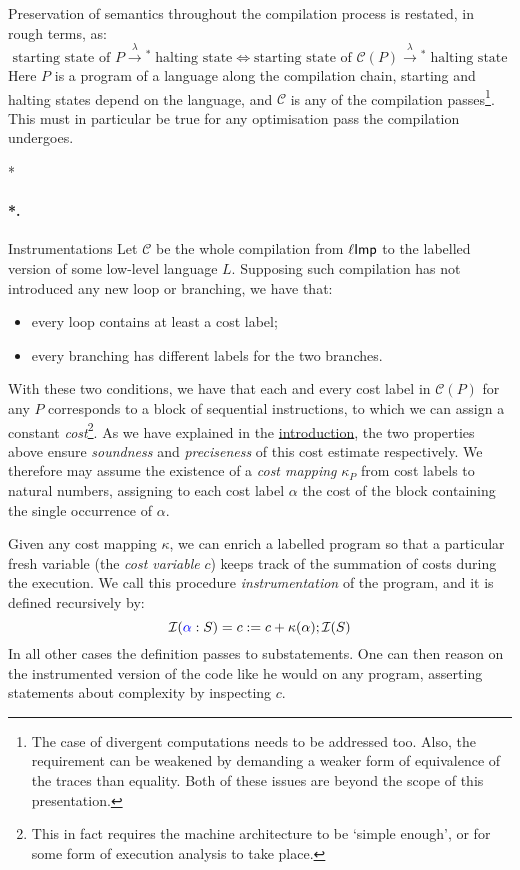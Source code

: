 \documentclass[submission,copyright,creativecommons]{eptcs}
\makeatletter
\theoremstyle{definition}
\newcommand{\imp}{{\sf Imp}}            \newcommand{\vm}{{\sf Vm}}              \newcommand{\mips}{{\sf Mips}}          \newcommand{\Clight}{{\sf Clight}}        \newcommand{\Cminor}{{\sf Cminor}}
\newcommand{\ass}{\mathrel{:=}}
\renewcommand{\to}[1][]{\stackrel{#1}{\rightarrow}}
\def\lbl#1:{\mbox{\color{blue}$#1$}:}
\let\oldparagraph\paragraph
\def\paragraph{\@ifnextchar*\new@paragraph@star\new@paragraph}
\def\new@paragraph@star*#1{\oldparagraph*{#1.}}
\def\new@paragraph#1{\oldparagraph{#1.}}
\makeatother
\begin{document}
Preservation of semantics throughout the compilation process is restated, in rough terms, as:
\begin{equation}\label{eq:preservation}
\text{starting state of $P$}\to[\lambda]\!\!^*\;\text{halting state} \iff
\text{starting state of $\mathcal C(P)$} \to[\lambda]\!\!^*\;\text{halting state}
\end{equation}
Here $P$ is a program of a language along the compilation chain, starting and halting states depend on the language, and $\mathcal C$ is any of the compilation passes\footnote{The case of divergent computations needs to be addressed too.
Also, the requirement can be weakened by demanding a weaker form of equivalence of the traces than equality.
Both of these issues are beyond the scope of this presentation.}. This must in
particular be true for any optimisation pass the compilation undergoes.

\paragraph*{Instrumentations}
Let $\mathcal C$ be the whole compilation from $\ell\imp$ to the labelled version of some low-level language $L$.
Supposing such compilation has not introduced any new loop or branching, we have that:
\begin{itemize}
\item
every loop contains at least a cost label;
\item
every branching has different labels for the two branches.
\end{itemize}
With these two conditions, we have that each and every cost label in $\mathcal C(P)$ for any $P$ corresponds to a block of sequential instructions, to which we can assign a constant \emph{cost}\footnote{This in fact requires the machine architecture to be `simple enough', or for some form of execution analysis to take place.}.
As we have explained in the \hyperref[sec:intro]{introduction}, the two
properties above ensure \emph{soundness} and \emph{preciseness} of this
cost estimate respectively.
We therefore may assume the existence of a \emph{cost mapping} $\kappa_P$ from cost labels to natural numbers, assigning to each cost label $\alpha$ the cost of the block containing the single occurrence of $\alpha$.

Given any cost mapping $\kappa$, we can enrich a labelled program so that a particular fresh variable (the \emph{cost variable} $c$) keeps track of the summation of costs during the execution.
We call this procedure \emph{instrumentation} of the program, and it is defined recursively by:
$$
\mathcal I(\lbl\alpha:S) = c \ass c + \kappa(\alpha) ; \mathcal I(S)
$$
In all other cases the definition passes to substatements. One can then reason
on the instrumented version of the code like he would on any program, asserting
statements about complexity by inspecting $c$.
\end{document}
